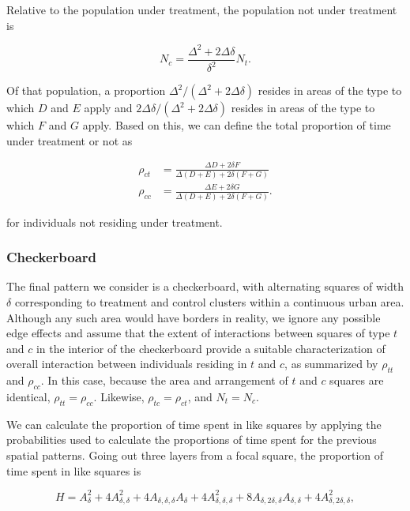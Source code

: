 \documentclass[11pt]{amsart}
\begin{document}
Relative to the population under treatment, the population not under treatment is

\begin{equation}
N_c=\frac{\Delta^2+2\Delta\delta}{\delta^2}N_t .
\end{equation}

\noindent Of that population, a proportion $\Delta^2/(\Delta^2+2\Delta\delta)$ resides in areas of the type to which $D$ and $E$ apply and $2\Delta\delta/(\Delta^2+2\Delta\delta)$ resides in areas of the type to which $F$ and $G$ apply. Based on this, we can define the total proportion of time under treatment or not as

\begin{align}
\rho_{ct} &= \frac{\Delta D+2\delta F}{\Delta(D+E)+2\delta(F+G)} \\
\rho_{cc} &= \frac{\Delta E+2\delta G}{\Delta(D+E)+2\delta(F+G)} .
\end{align}

\noindent for individuals not residing under treatment.

\subsubsection{Checkerboard}

The final pattern we consider is a checkerboard, with alternating squares of width $\delta$ corresponding to treatment and control clusters within a continuous urban area. Although any such area would have borders in reality, we ignore any possible edge effects and assume that the extent of interactions between squares of type $t$ and $c$ in the interior of the checkerboard provide a suitable characterization of overall interaction between individuals residing in $t$ and $c$, as summarized by $\rho_{tt}$ and $\rho_{cc}$. In this case, because the area and arrangement of $t$ and $c$ squares are identical, $\rho_{tt}=\rho_{cc}$. Likewise, $\rho_{tc}=\rho_{ct}$, and $N_t=N_c$.

We can calculate the proportion of time spent in like squares by applying the probabilities used to calculate the proportions of time spent for the previous spatial patterns. Going out three layers from a focal square, the proportion of time spent in like squares is

\begin{equation}
H = A_\delta^2 + 4 A_{\delta,\delta}^2 + 4 A_{\delta,\delta,\delta}A_\delta + 4 A_{\delta,\delta,\delta}^2 + 8 A_{\delta,2\delta,\delta} A_{\delta,\delta} + 4 A_{\delta,2\delta,\delta}^2 ,
\end{equation}
\end{document}

